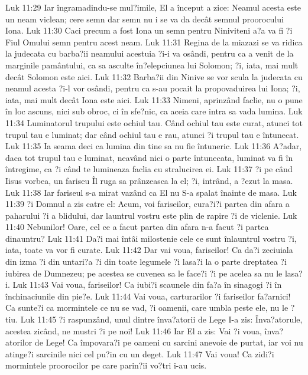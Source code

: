 Luk 11:29  Iar îngramadindu-se mul?imile, El a început a zice: Neamul acesta este un neam viclean; cere semn dar semn nu i se va da decât semnul proorocului Iona.
Luk 11:30  Caci precum a fost Iona un semn pentru Niniviteni a?a va fi ?i Fiul Omului semn pentru acest neam.
Luk 11:31  Regina de la miazazi se va ridica la judecata cu barba?ii neamului acestuia ?i-i va osândi, pentru ca a venit de la marginile pamântului, ca sa asculte în?elepciunea lui Solomon; ?i, iata, mai mult decât Solomon este aici.
Luk 11:32  Barba?ii din Ninive se vor scula la judecata cu neamul acesta ?i-l vor osândi, pentru ca s-au pocait la propovaduirea lui Iona; ?i, iata, mai mult decât Iona este aici.
Luk 11:33  Nimeni, aprinzând faclie, nu o pune în loc ascuns, nici sub obroc, ci în sfe?nic, ca aceia care intra sa vada lumina.
Luk 11:34  Luminatorul trupului este ochiul tau. Când ochiul tau este curat, atunci tot trupul tau e luminat; dar când ochiul tau e rau, atunci ?i trupul tau e întunecat.
Luk 11:35  Ia seama deci ca lumina din tine sa nu fie întuneric.
Luk 11:36  A?adar, daca tot trupul tau e luminat, neavând nici o parte întunecata, luminat va fi în întregime, ca ?i când te lumineaza faclia cu stralucirea ei.
Luk 11:37  ?i pe când Iisus vorbea, un fariseu Îl ruga sa prânzeasca la el; ?i, intrând, a ?ezut la masa.
Luk 11:38  Iar fariseul s-a mirat vazând ca El nu S-a spalat înainte de masa.
Luk 11:39  ?i Domnul a zis catre el: Acum, voi fariseilor, cura?i?i partea din afara a paharului ?i a blidului, dar launtrul vostru este plin de rapire ?i de viclenie.
Luk 11:40  Nebunilor! Oare, cel ce a facut partea din afara n-a facut ?i partea dinauntru?
Luk 11:41  Da?i mai întâi milostenie cele ce sunt înlauntrul vostru ?i, iata, toate va vor fi curate.
Luk 11:42  Dar vai voua, fariseilor! Ca da?i zeciuiala din izma ?i din untari?a ?i din toate legumele ?i lasa?i la o parte dreptatea ?i iubirea de Dumnezeu; pe acestea se cuvenea sa le face?i ?i pe acelea sa nu le lasa?i.
Luk 11:43  Vai voua, fariseilor! Ca iubi?i scaunele din fa?a în sinagogi ?i în închinaciunile din pie?e.
Luk 11:44  Vai voua, carturarilor ?i fariseilor fa?arnici! Ca sunte?i ca mormintele ce nu se vad, ?i oamenii, care umbla peste ele, nu le ?tiu.
Luk 11:45  ?i raspunzând, unul dintre înva?atorii de Lege I-a zis: Înva?atorule, acestea zicând, ne mustri ?i pe noi!
Luk 11:46  Iar El a zis: Vai ?i voua, înva?atorilor de Lege! Ca împovara?i pe oameni cu sarcini anevoie de purtat, iar voi nu atinge?i sarcinile nici cel pu?in cu un deget.
Luk 11:47  Vai voua! Ca zidi?i mormintele proorocilor pe care parin?ii vo?tri i-au ucis.
